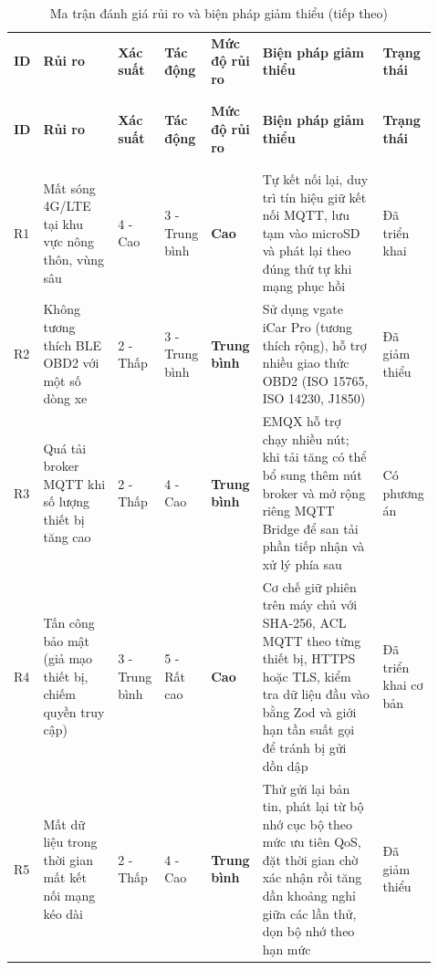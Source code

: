 \documentclass[a4paper]{extarticle}
\newcommand{\thesissettableid}[2]{%
  \renewcommand{\thetable}{#1}%
  \renewcommand{\theHtable}{#2}%
}
\begin{document}
{\thesissettableid{5.8}{tab-ch5-ma-tran-anh-gia-rui-ro-va-bien-phap-giam-thieu}
\def\LTcaptype{table}
\begin{longtable}{|L{0.055\linewidth}|L{0.180\linewidth}|L{0.090\linewidth}|L{0.090\linewidth}|L{0.120\linewidth}|L{0.300\linewidth}|L{0.090\linewidth}|}
\caption{Ma trận đánh giá rủi ro và biện pháp giảm thiểu}\label{tab:ch5-ma-tran-anh-gia-rui-ro-va-bien-phap-giam-thieu}\\
\hline \textbf{ID} & \textbf{Rủi ro} & \textbf{Xác suất} & \textbf{Tác động} & \textbf{Mức độ rủi ro} & \textbf{Biện pháp giảm thiểu} & \textbf{Trạng thái} \\
\\\hline
\endfirsthead
\caption[]{Ma trận đánh giá rủi ro và biện pháp giảm thiểu (tiếp theo)}\\
\hline \textbf{ID} & \textbf{Rủi ro} & \textbf{Xác suất} & \textbf{Tác động} & \textbf{Mức độ rủi ro} & \textbf{Biện pháp giảm thiểu} & \textbf{Trạng thái} \\
\\\hline
\endhead
\\\hline
\endfoot
\endlastfoot
R1 & Mất sóng 4G/LTE tại khu vực nông thôn, vùng sâu & 4 - Cao & 3 -
Trung bình & \textbf{Cao} & Tự kết nối lại, duy trì tín hiệu giữ kết nối
MQTT, lưu tạm vào microSD và phát lại theo đúng thứ tự khi mạng phục hồi & Đã triển khai \\\hline
R2 & Không tương thích BLE OBD2 với một số dòng xe & 2 - Thấp & 3 -
Trung bình & \textbf{Trung bình} & Sử dụng vgate iCar Pro (tương thích
rộng), hỗ trợ nhiều giao thức OBD2 (ISO 15765, ISO 14230, J1850) & Đã
giảm thiểu \\\hline
R3 & Quá tải broker MQTT khi số lượng thiết bị tăng cao & 2 - Thấp & 4 -
Cao & \textbf{Trung bình} & EMQX hỗ trợ chạy nhiều nút; khi tải tăng có
thể bổ sung thêm nút broker và mở rộng riêng MQTT Bridge để san tải phần tiếp
nhận và xử lý phía sau & Có phương án \\\hline
R4 & Tấn công bảo mật (giả mạo thiết bị, chiếm quyền truy cập) & 3 -
Trung bình & 5 - Rất cao & \textbf{Cao} & Cơ chế giữ phiên trên máy chủ với
SHA-256, ACL MQTT theo từng thiết bị, HTTPS hoặc TLS, kiểm tra dữ liệu đầu vào bằng Zod và giới hạn tần suất gọi để tránh bị gửi dồn dập & Đã triển khai cơ bản \\\hline
R5 & Mất dữ liệu trong thời gian mất kết nối mạng kéo dài & 2 - Thấp & 4
- Cao & \textbf{Trung bình} & Thử gửi lại bản tin, phát lại từ bộ nhớ cục bộ theo mức ưu tiên QoS,
đặt thời gian chờ xác nhận rồi tăng dần khoảng nghỉ giữa các lần thử, dọn bộ nhớ theo hạn mức & Đã giảm thiểu \\\hline

\end{longtable}}
\end{document}
